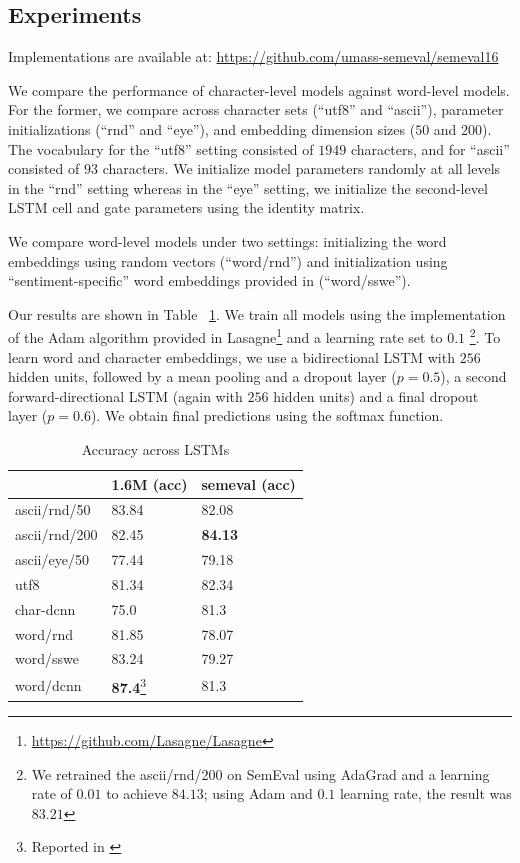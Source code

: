 \documentclass{article} %
\begin{document}
\subsection{Experiments}
Implementations are available at: \url{https://github.com/umass-semeval/semeval16}

We compare the performance of character-level models against word-level models. For the former, we compare across character sets (``utf8'' and ``ascii''), parameter initializations (``rnd'' and ``eye''), and embedding dimension sizes ($50$ and $200$). The vocabulary for the ``utf8'' setting consisted of $1949$ characters, and for ``ascii'' consisted of $93$ characters. We initialize model parameters randomly at all levels in the ``rnd'' setting whereas in the ``eye'' setting, we initialize the second-level LSTM cell and gate parameters using the identity matrix.

We compare word-level models under two settings: initializing the word embeddings using random vectors (``word/rnd'') and initialization using ``sentiment-specific'' word embeddings provided in \cite{tang2014learning} (``word/sswe'').

Our results are shown in Table ~\ref{table:results}. We train all models using the implementation of the Adam algorithm \cite{kingma2014adam} provided in Lasagne\footnote{\url{https://github.com/Lasagne/Lasagne}} and a learning rate set to $0.1$ \footnote{We retrained the ascii/rnd/200 on SemEval using AdaGrad and a learning rate of $0.01$ to achieve $84.13$; using Adam and $0.1$ learning rate, the result was $83.21$}. To learn word and character embeddings, we use a bidirectional LSTM with $256$ hidden units, followed by a mean pooling and a dropout layer ($p=0.5$), a second forward-directional LSTM (again with $256$ hidden units) and a final dropout layer ($p=0.6$). We obtain final predictions using the softmax function.

\begin{table}[h!]
\centering
\caption{Accuracy across LSTMs}
\begin{tabular}{|l|ll|}
\hline
              & 1.6M (acc)          & semeval (acc) \\
\hline
ascii/rnd/50  & 83.84          & 82.08            \\
ascii/rnd/200 & 82.45          & \textbf{84.13}   \\
ascii/eye/50  & 77.44          & 79.18   \\
utf8          & 81.34          & 82.34   \\
char-dcnn     & 75.0           & 81.3    \\
word/rnd      & 81.85          & 78.07   \\
word/sswe     & 83.24          & 79.27   \\
word/dcnn     & \textbf{87.4}\footnote{Reported in \cite{kalchbrenner2014convolutional}}           & 81.3    \\
\hline
\end{tabular}
\label{table:results}
\end{table}
\end{document}
